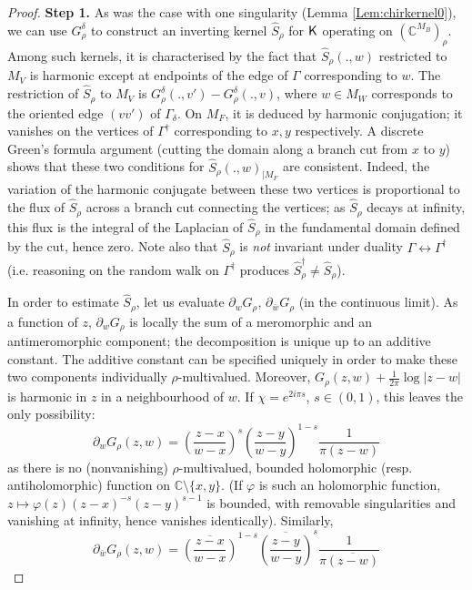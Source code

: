 \documentclass[10pt]{article}
\newcommand{\C}{\mathbb{C}}
\newcommand{\rK}{{\sf K}}
\newcommand{\dg}{\dagger}
\begin{document}
\begin{proof}
{\bf Step 1.} 
As was the case with one singularity (Lemma \ref{Lem:chirkernel0}), we can use $G^\delta_\rho$ to construct an inverting kernel $\hat S_\rho$ for $\rK$ operating on $(\C^{M_B})_\rho$. Among such kernels, it is characterised by the fact that $\hat S_\rho(.,w)$ restricted to $M_V$ is harmonic except at endpoints of the edge of $\Gamma$ corresponding to $w$. The restriction of $\hat S_\rho$ to $M_V$ is $G^\delta_\rho(.,v')-G^\delta_\rho(.,v)$, where $w\in M_W$ corresponds to the oriented edge $(vv')$ of $\Gamma_\delta$. 
On $M_F$, it is deduced by harmonic conjugation; it vanishes on the vertices of $\Gamma^\dg$ corresponding to $x,y$ respectively. A discrete Green's formula argument (cutting the domain along a branch cut from $x$ to $y$) shows that these two conditions for $\hat S_\rho(.,w)_{|M_F}$ are consistent. Indeed, the variation of the harmonic conjugate between these two vertices is proportional to the flux of $\hat S_\rho$ across a branch cut connecting the vertices; as $\hat S_\rho$ decays at infinity, this flux is the integral of the Laplacian of $\hat S_\rho$ in the fundamental domain defined by the cut, hence zero. Note also  that $\hat S_\rho$ is {\em not} invariant under duality $\Gamma\leftrightarrow\Gamma^\dg$ (i.e. reasoning on the random walk on $\Gamma^\dg$ produces $\hat S_\rho^\dg\neq\hat S_\rho$).

In order to estimate $\hat S_\rho$, let us evaluate $\partial_wG_\rho$, $\partial_{\bar w}G_\rho$ (in the continuous limit). As a function of $z$, $\partial_wG_\rho$ is locally the sum of a meromorphic and an antimeromorphic component; the decomposition is unique up to an additive constant. The additive constant can be specified uniquely in order to make these two components individually $\rho$-multivalued. Moreover, $G_\rho(z,w)+\frac 1{2\pi}\log|z-w|$ is harmonic in $z$ in a neighbourhood of $w$.
If $\chi=e^{2i\pi s}$, $s\in (0,1)$, this leaves the only possibility:
$$\partial_wG_\rho(z,w)=\left(\frac{z-x}{w-x}\right)^s\left(\frac{z-y}{w-y}\right)^{1-s}\frac{1}{\pi(z-w)}$$
as there is no (nonvanishing) $\rho$-multivalued, bounded holomorphic (resp. antiholomorphic) function on $\C\setminus\{x,y\}$. (If $\varphi$ is such an holomorphic function, $z\mapsto\varphi(z)(z-x)^{-s}(z-y)^{s-1}$ is bounded, with removable singularities and vanishing at infinity, hence vanishes identically). Similarly,
$$\partial_{\bar w}G_\rho(z,w)=\overline{\left(\frac{z-x}{w-x}\right)}^{1-s}\overline{\left(\frac{z-y}{w-y}\right)}^{s}\frac{1}{\pi\overline{(z-w)}}$$



\end{proof}
\end{document}
